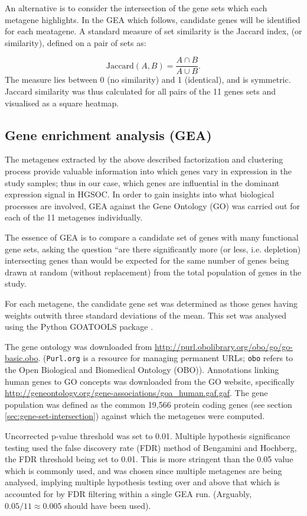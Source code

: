 \documentclass[tikz, 11pt,a4paper,oneside,fleqn]{article}
\begin{document}
An alternative is to consider the intersection of the gene sets which each metagene highlights.  In the GEA which follows, candidate genes will be identified for each meatagene.  A standard measure of set similarity is the Jaccard index, (or similarity), defined on a pair of sets as:

\[
   \mbox{Jaccard}(A, B) = \frac{A \cap B}{A \cup B}.
\]
The measure lies between 0 (no similarity) and 1 (identical), and is symmetric.  Jaccard similarity was thus calculated for all pairs of the 11 genes sets and visualised as a square heatmap.
	   	  
\subsection{Gene enrichment analysis (GEA)}
\label{sec-gea}
The metagenes extracted by the above described factorization and clustering process provide valuable information into which genes vary in expression in the study samples; thus in our case, which genes are influential in the dominant expression signal in HGSOC.  
In order to gain insights into what biological processes are involved, GEA against the Gene Ontology (GO) was carried out for each of the 11 metagenes individually.

The essence of GEA is to compare a candidate set of genes with many functional gene sets, asking the question ``are there significantly more (or less, i.e. depletion) intersecting genes than would be expected for the same number of genes being drawn at random (without replacement) from the total population of genes in the study. 

For each metagene, the candidate gene set was determined as those genes having weights outwith three standard deviations of the mean.   This set was analysed using the Python GOATOOLS package \cite{Klopfenstein2018}.   

The gene ontology was downloaded from \url{http://purl.obolibrary.org/obo/go/go-basic.obo}.  ({\tt Purl.org} is a resource for managing permanent URLs; {\tt obo} refers to the Open Biological and Biomedical Ontology (OBO)).  
Annotations linking human genes to GO concepts was downloaded from the GO website, specifically \url{http://geneontology.org/gene-associations/goa_human.gaf.gaf}.   
The gene population was defined as the common 19,566 protein coding genes (see section \ref{sec:gene-set-intersection}) against which the metagenes were computed.  

Uncorrected p-value threshold was set to 0.01.
Multiple hypothesis significance testing used the false discovery rate (FDR) method of Bengamini and Hochberg, the FDR threshold being set to 0.01.  This is more stringent than the 0.05 value which is commonly used, and was chosen since multiple metagenes are being analysed, implying multiple hypothesis testing over and above that which is accounted for by FDR filtering within a single GEA run.  (Arguably, $0.05 / 11 \approx 0.005$ should have been used).
\end{document}
